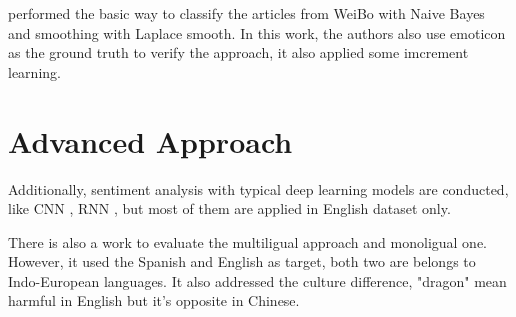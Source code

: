 \cite{zhao2012moodlens} performed the basic way to classify the articles from WeiBo with Naive Bayes and smoothing with Laplace smooth.  
In this work, the authors also use emoticon as the ground truth to verify the approach, it also applied some imcrement learning. \\


\section{Advanced Approach}

Additionally, sentiment analysis with typical deep learning models are conducted, like CNN 
\cite{kim2014convolutional}, RNN \cite{arevian2007recurrent}, but most of them are applied in English dataset only. 

There is also a work\cite{multilingual} to evaluate the multiligual approach and monoligual one. However, it used the Spanish and English as target, both two are belongs 
to Indo-European languages. It also addressed the culture difference, "dragon" mean harmful in English but it's opposite in Chinese. 
